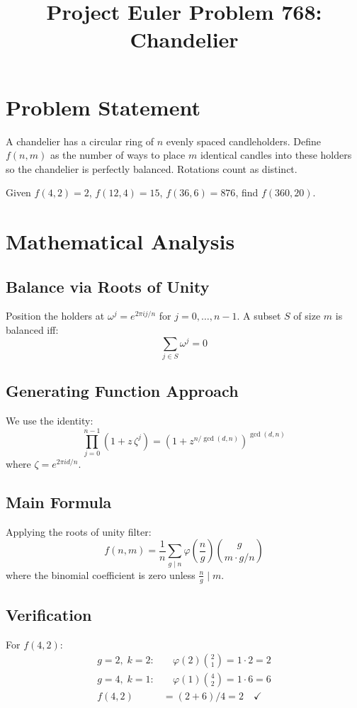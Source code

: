 \documentclass[12pt]{article}
\title{Project Euler Problem 768: Chandelier}
\author{}
\date{}
\begin{document}
\maketitle

\section{Problem Statement}
A chandelier has a circular ring of $n$ evenly spaced candleholders. Define $f(n, m)$ as the number of ways to place $m$ identical candles into these holders so the chandelier is perfectly balanced. Rotations count as distinct.

Given $f(4,2)=2$, $f(12,4)=15$, $f(36,6)=876$, find $f(360, 20)$.

\section{Mathematical Analysis}

\subsection{Balance via Roots of Unity}
Position the holders at $\omega^j = e^{2\pi i j/n}$ for $j = 0, \ldots, n-1$. A subset $S$ of size $m$ is balanced iff:
\[
    \sum_{j \in S} \omega^j = 0
\]

\subsection{Generating Function Approach}
We use the identity:
\[
    \prod_{j=0}^{n-1}(1 + z\,\zeta^j) = (1 + z^{n/\gcd(d,n)})^{\gcd(d,n)}
\]
where $\zeta = e^{2\pi i d/n}$.

\subsection{Main Formula}
Applying the roots of unity filter:
\[
    f(n, m) = \frac{1}{n}\sum_{g \mid n} \varphi\!\left(\frac{n}{g}\right) \binom{g}{m \cdot g/n}
\]
where the binomial coefficient is zero unless $\frac{n}{g} \mid m$.

\subsection{Verification}
For $f(4, 2)$:
\begin{align*}
    g=2,\; k=2: &\quad \varphi(2)\binom{2}{1} = 1 \cdot 2 = 2 \\
    g=4,\; k=1: &\quad \varphi(1)\binom{4}{2} = 1 \cdot 6 = 6 \\
    f(4,2) &= (2+6)/4 = 2 \quad\checkmark
\end{align*}
\end{document}
